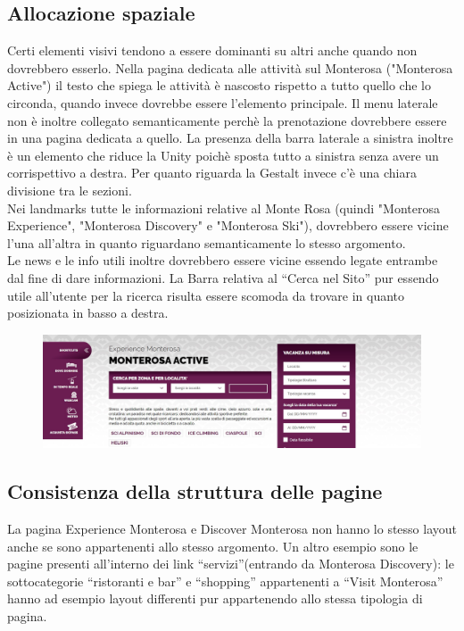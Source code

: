         \subsection{Allocazione spaziale}
        Certi elementi visivi tendono a essere dominanti su altri anche quando
        non dovrebbero esserlo. Nella pagina dedicata alle attività sul
        Monterosa ("Monterosa Active") il testo che spiega le attività è
        nascosto rispetto a tutto quello che lo circonda, quando invece dovrebbe
        essere l’elemento principale. Il menu laterale non è inoltre collegato
        semanticamente perchè la prenotazione dovrebbere essere in una pagina
        dedicata a quello. La presenza della barra laterale a sinistra inoltre è
        un elemento che riduce la Unity poichè sposta tutto a sinistra senza
        avere un corrispettivo a destra. Per quanto riguarda la Gestalt invece
        c’è una chiara divisione tra le sezioni.\\ 
        Nei landmarks tutte le informazioni relative al Monte Rosa (quindi "Monterosa
        Experience", "Monterosa Discovery" e "Monterosa Ski"), dovrebbero essere vicine 
        l'una all'altra in quanto riguardano semanticamente lo stesso argomento.\\
        Le news e le info utili inoltre dovrebbero essere vicine essendo legate
        entrambe dal fine di dare informazioni. La Barra relativa al “Cerca nel
        Sito” pur essendo utile all'utente per la ricerca risulta essere scomoda
        da trovare in quanto posizionata in basso a destra.
        \begin{figure}[H]
            \centering 
            \includegraphics[scale=0.3]{resources/images/spatialAllocationFinal.jpg}
        \end{figure}
        
        \subsection{Consistenza della struttura delle pagine}
        La pagina Experience Monterosa e Discover Monterosa non hanno lo stesso
        layout anche se sono appartenenti allo stesso argomento. Un altro
        esempio sono le pagine presenti all'interno  dei link “servizi”(entrando
        da Monterosa Discovery): le sottocategorie “ristoranti e bar” e
        “shopping” appartenenti a “Visit Monterosa” hanno ad esempio layout
        differenti pur appartenendo allo stessa tipologia di pagina.

